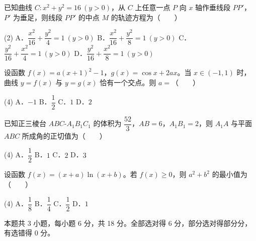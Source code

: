 \begin{question}
已知曲线 $C:x^{2}+y^{2}=16\ (y>0)$，从 $C$ 上任意一点 $P$ 向 $x$ 轴作垂线段 $PP'$，$P'$ 为垂足，则线段 $PP'$ 的中点 $M$ 的轨迹方程为\mbox{（　　）}

\begin{gkopts}(2)
\task A．$\dfrac{x^{2}}{16}+\dfrac{y^{2}}4=1\ (y>0)$
\task B．$\dfrac{x^{2}}{16}+\dfrac{y^{2}}8=1\ (y>0)$
\task C．$\dfrac{y^{2}}{16}+\dfrac{x^{2}}4=1\ (y>0)$
\task D．$\dfrac{y^{2}}{16}+\dfrac{x^{2}}8=1\ (y>0)$
\end{gkopts}

\end{question}
\begin{question}
设函数 $f(x)=a(x+1)^{2}-1$，$g(x)=\cos x+2ax$。当 $x\in(-1,1)$ 时，曲线 $y=f(x)$ 与 $y=g(x)$ 恰有一个交点。则 $a=$\mbox{（　　）}

\begin{gkopts}(4)
\task A．$-1$
\task B．$\dfrac12$
\task C．$1$
\task D．$2$
\end{gkopts}

\end{question}
\begin{question}
已知正三棱台 $ABC\text{-}A_1B_1C_1$ 的体积为 $\dfrac{52}3$，$AB=6$，$A_1B_1=2$，则 $A_1A$ 与平面 $ABC$ 所成角的正切值为\mbox{（　　）}

\begin{gkopts}(4)
\task A．$\dfrac12$
\task B．$1$
\task C．$2$
\task D．$3$
\end{gkopts}

\end{question}
\begin{question}
设函数 $f(x)=(x+a)\ln(x+b)$。若 $f(x)\ge0$，则 $a^{2}+b^{2}$ 的最小值为\mbox{（　　）}

\begin{gkopts}(4)
\task A．$\dfrac18$
\task B．$\dfrac14$
\task C．$\dfrac12$
\task D．$1$
\end{gkopts}

\par\medskip

\end{question}

\begin{gktip}
本题共 3 小题，每小题 6 分，共 18 分。全部选对得 6 分，部分选对得部分分，有选错得 0 分。
\end{gktip}

